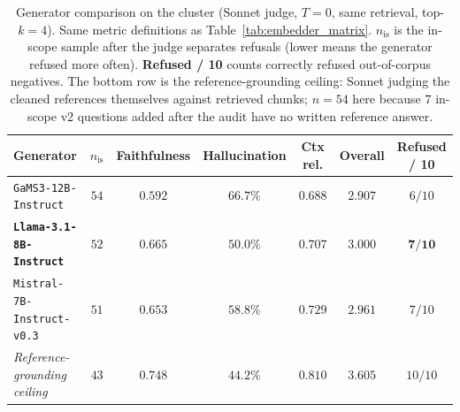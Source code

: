 \documentclass[fleqn,moreauthors,10pt]{ds_report}
\begin{document}
\begin{table}[hbt]
	\caption{Generator comparison on the cluster (Sonnet judge, $T{=}0$, same retrieval, top-$k{=}4$). Same metric definitions as Table~\ref{tab:embedder_matrix}. $n_{\text{is}}$ is the in-scope sample after the judge separates refusals (lower means the generator refused more often). \textbf{Refused / 10} counts correctly refused out-of-corpus negatives. The bottom row is the reference-grounding ceiling: Sonnet judging the cleaned references themselves against retrieved chunks; $n{=}54$ here because $7$ in-scope v2 questions added after the audit have no written reference answer.}
	\centering
	\begin{tabular}{l|c|c|c|c|c|c}
		\toprule
		\textbf{Generator} & $n_{\text{is}}$ & \textbf{Faithfulness} & \textbf{Hallucination} & \textbf{Ctx rel.} & \textbf{Overall} & \textbf{Refused / 10} \\
		\midrule
		\texttt{GaMS3-12B-Instruct} & $54$ & $0.592$ & $66.7\%$ & $0.688$ & $2.907$ & $6 / 10$ \\
		\textbf{\texttt{Llama-3.1-8B-Instruct}} & $52$ & $\mathbf{0.665}$ & $\mathbf{50.0\%}$ & $0.707$ & $\mathbf{3.000}$ & $\mathbf{7 / 10}$ \\
		\texttt{Mistral-7B-Instruct-v0.3} & $51$ & $0.653$ & $58.8\%$ & $\mathbf{0.729}$ & $2.961$ & $7 / 10$ \\
		\midrule
		\emph{Reference-grounding ceiling} & $43$ & $0.748$ & $44.2\%$ & $0.810$ & $3.605$ & $10 / 10$ \\
		\bottomrule
	\end{tabular}
	\label{tab:generators}
\end{table}

\end{document}
